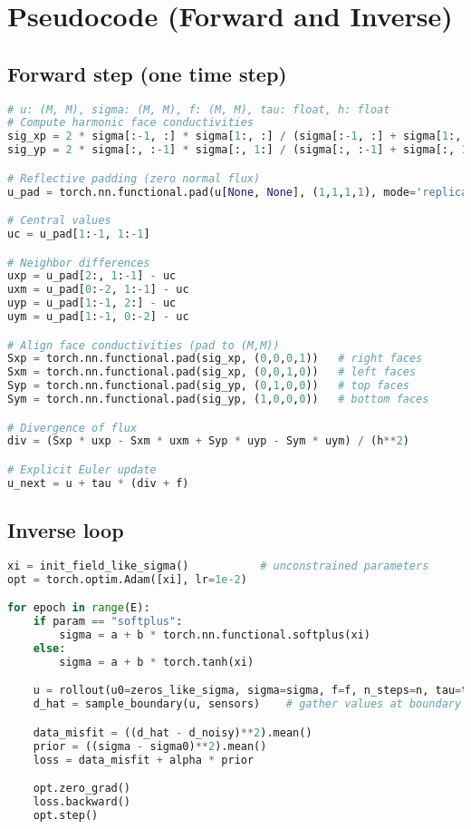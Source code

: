 \documentclass[11pt,a4paper]{article}
\numberwithin{equation}{section}
\begin{document}
\appendix
\section{Pseudocode (Forward and Inverse)}
\subsection*{Forward step (one time step)}
\begin{lstlisting}[language=Python,caption={Finite-volume forward step (vectorized PyTorch sketch).}]
# u: (M, M), sigma: (M, M), f: (M, M), tau: float, h: float
# Compute harmonic face conductivities
sig_xp = 2 * sigma[:-1, :] * sigma[1:, :] / (sigma[:-1, :] + sigma[1:, :])
sig_yp = 2 * sigma[:, :-1] * sigma[:, 1:] / (sigma[:, :-1] + sigma[:, 1:])

# Reflective padding (zero normal flux)
u_pad = torch.nn.functional.pad(u[None, None], (1,1,1,1), mode='replicate')[0,0]

# Central values
uc = u_pad[1:-1, 1:-1]

# Neighbor differences
uxp = u_pad[2:, 1:-1] - uc
uxm = u_pad[0:-2, 1:-1] - uc
uyp = u_pad[1:-1, 2:] - uc
uym = u_pad[1:-1, 0:-2] - uc

# Align face conductivities (pad to (M,M))
Sxp = torch.nn.functional.pad(sig_xp, (0,0,0,1))   # right faces
Sxm = torch.nn.functional.pad(sig_xp, (0,0,1,0))   # left faces
Syp = torch.nn.functional.pad(sig_yp, (0,1,0,0))   # top faces
Sym = torch.nn.functional.pad(sig_yp, (1,0,0,0))   # bottom faces

# Divergence of flux
div = (Sxp * uxp - Sxm * uxm + Syp * uyp - Sym * uym) / (h**2)

# Explicit Euler update
u_next = u + tau * (div + f)
\end{lstlisting}

\subsection*{Inverse loop}
\begin{lstlisting}[language=Python,caption={Gradient-based inversion with Tikhonov regularization.}]
xi = init_field_like_sigma()           # unconstrained parameters
opt = torch.optim.Adam([xi], lr=1e-2)

for epoch in range(E):
    if param == "softplus":
        sigma = a + b * torch.nn.functional.softplus(xi)
    else:
        sigma = a + b * torch.tanh(xi)

    u = rollout(u0=zeros_like_sigma, sigma=sigma, f=f, n_steps=n, tau=tau)
    d_hat = sample_boundary(u, sensors)    # gather values at boundary sensor coords

    data_misfit = ((d_hat - d_noisy)**2).mean()
    prior = ((sigma - sigma0)**2).mean()
    loss = data_misfit + alpha * prior

    opt.zero_grad()
    loss.backward()
    opt.step()
\end{lstlisting}
\end{document}
